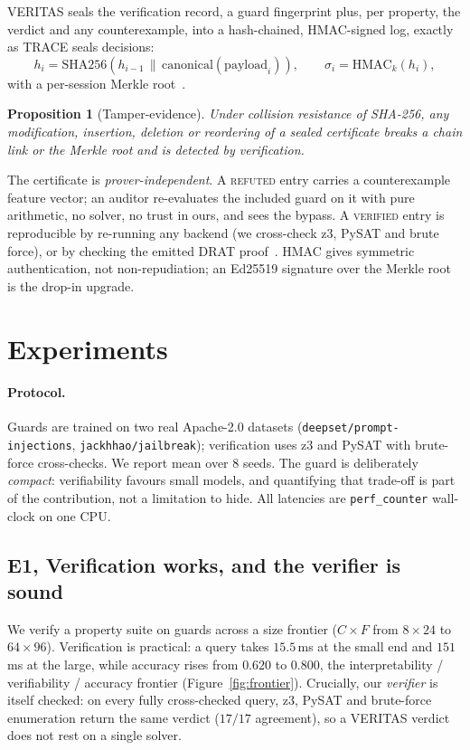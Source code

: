 \documentclass[11pt]{article}
\newtheorem{proposition}{Proposition}
\newcommand{\soundChecks}{17}\newcommand{\soundAgree}{17}
\newcommand{\frLoC}{8}\newcommand{\frLoAcc}{0.620}\newcommand{\frLoMs}{15.5}
\newcommand{\frHiC}{64}\newcommand{\frHiAcc}{0.800}\newcommand{\frHiMs}{151}
\begin{document}
VERITAS seals the verification record, a guard fingerprint plus, per property, the
verdict and any counterexample, into a hash-chained, HMAC-signed log, exactly as
TRACE seals decisions:
\[
h_i = \mathrm{SHA256}(h_{i-1}\,\|\,\mathrm{canonical}(\mathrm{payload}_i)),\qquad
\sigma_i = \mathrm{HMAC}_k(h_i),
\]
with a per-session Merkle root~\citep{laurie2013ct,schneier1998securelogs,krawczyk1997hmac}.
\begin{proposition}[Tamper-evidence]\label{prop:tamper}
Under collision resistance of SHA-256, any modification, insertion, deletion or
reordering of a sealed certificate breaks a chain link or the Merkle root and is
detected by verification.
\end{proposition}
The certificate is \emph{prover-independent}. A \textsc{refuted} entry carries a
counterexample feature vector; an auditor re-evaluates the included guard on it with
pure arithmetic, no solver, no trust in ours, and sees the bypass. A
\textsc{verified} entry is reproducible by re-running any backend (we cross-check
z3, PySAT and brute force), or by checking the emitted DRAT proof~\citep{wetzler2014drat}.
HMAC gives symmetric authentication, not non-repudiation; an Ed25519 signature over
the Merkle root is the drop-in upgrade.

\section{Experiments}
\label{sec:exp}

\paragraph{Protocol.} Guards are trained on two real Apache-2.0 datasets
(\texttt{deepset/prompt-injections}, \texttt{jackhhao/jailbreak}); verification uses
z3 and PySAT with brute-force cross-checks. We report mean over 8 seeds. The guard
is deliberately \emph{compact}: verifiability favours small models, and quantifying
that trade-off is part of the contribution, not a limitation to hide. All latencies
are \texttt{perf\_counter} wall-clock on one CPU.

\subsection{E1, Verification works, and the verifier is sound}
We verify a property suite on guards across a size frontier
($C{\times}F$ from $\frLoC{\times}24$ to $\frHiC{\times}96$). Verification is
practical: a query takes $\frLoMs$\,ms at the small end and $\frHiMs$\,ms at the
large, while accuracy rises from $\frLoAcc$ to $\frHiAcc$, the interpretability
/ verifiability / accuracy frontier (Figure~\ref{fig:frontier}). Crucially, our
\emph{verifier} is itself checked: on every fully cross-checked query, z3, PySAT
and brute-force enumeration return the same verdict
($\soundAgree/\soundChecks$ agreement), so a VERITAS verdict does not rest on a
single solver.
\end{document}
